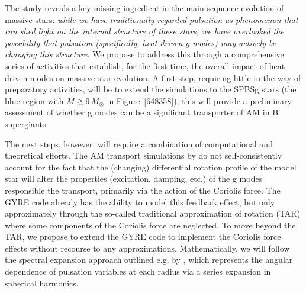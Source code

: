 The \citet{Townsend:2017} study reveals a key missing ingredient in the main-sequence evolution of massive stars: \emph{while we have traditionally regarded pulsation as phenomenon that can shed light on the internal structure of these stars, we have overlooked the possibility that pulsation (specifically, heat-driven g modes) may actively be changing this structure}. We propose to address this through a comprehensive series of activities that establish, for the first time, the overall impact of heat-driven modes on massive star evolution. A first step, requiring little in the way of preparatory activities, will be to extend the \citet{Townsend:2017} simulations to the SPBSg stars (the blue region with $M \gtrsim 9\,M_{\odot}$ in Figure~\ref{648358}); this will provide a preliminary assessment of whether g modes can be a significant transporter of AM in B supergiants.

The next steps, however, will require a combination of computational and theoretical efforts.
The AM transport simulations by \citet{Townsend:2017} do not self-consistently account for the fact that the (changing) differential rotation profile of the model star will alter the properties (excitation, damping, etc.) of the g modes responsible the transport, primarily via the action of the Coriolis force. The GYRE code already has the ability to model this feedback effect, but only approximately through the so-called traditional approximation of rotation (TAR) where some components of the Coriolis force are neglected. To move beyond the TAR, we propose to extend the GYRE code to implement the Coriolis force effects without recourse to any approximations. Mathematically, we will follow the spectral expansion approach outlined e.g. by \citet{Lee:2001}, which represents the angular dependence of pulsation variables at each radius via a series expansion in spherical harmonics. 



